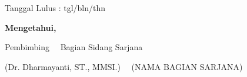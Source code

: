 \begin{center}
    \vspace{0.1cm}
    \begin{flushright}
        {Tanggal Lulus : tgl/bln/thn}
    \end{flushright}

    {\bf Mengetahui,}

    \vspace{0.5cm}

    {Pembimbing~ \hspace{5.0cm} ~Bagian Sidang Sarjana}%

    \vspace{1.5cm}

    {(Dr. Dharmayanti, ST., MMSI.)~ \hfill ~(NAMA BAGIAN SARJANA)}%


\end{center}

